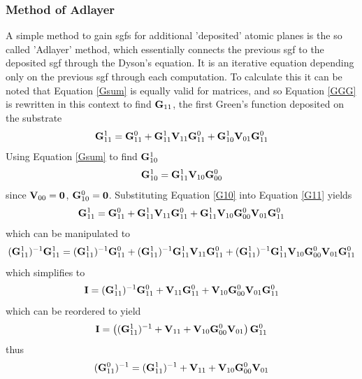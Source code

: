 \documentclass[a4paper, 12pt]{article}
\begin{document}
	\subsubsection{Method of Adlayer}
	A simple method to gain \gls{sgf}s for additional 'deposited' atomic planes is the so called 'Adlayer' method, which essentially connects the previous \gls{sgf} to the deposited \gls{sgf} through the Dyson's equation. It is an iterative equation depending only on the previous \gls{sgf} through each computation. To calculate this it can be noted that Equation \eqref{Gsum} is equally valid for matrices, and so Equation \eqref{GGG} is rewritten in this context to find ${\bf G}_{11}$, the first Green's function deposited on the substrate
	\begin{equation}\label{G11}
	{\bf G}_{11}^1={\bf G}_{11}^0+{\bf G}_{11}^1{\bf V}_{11}{\bf G}_{11}^0 +{\bf G}_{10}^1{\bf V}_{01}{\bf G}_{11}^0
\end{equation}
Using Equation \eqref{Gsum} to find ${\bf G}_{10}^1$
\begin{equation}\label{G10}
	{\bf G}_{10}^1={\bf G}_{11}^1{\bf V}_{10}{\bf G}_{00}^0
\end{equation}
since ${\bf V}_{00} = \bf 0$, ${\bf G}_{10}^0 = \bf 0$. Substituting Equation \eqref{G10} into Equation \eqref{G11} yields
	\begin{equation}
	{\bf G}_{11}^1={\bf G}_{11}^0+{\bf G}_{11}^1{\bf V}_{11}{\bf G}_{11}^0 +{\bf G}_{11}^1{\bf V}_{10}{\bf G}_{00}^0{\bf V}_{01}{\bf G}_{11}^0
\end{equation}
which can be manipulated to
	\begin{equation}
		({\bf G}_{11}^1)^{-1}{\bf G}_{11}^1=({\bf G}_{11}^1)^{-1}{\bf G}_{11}^0+({\bf G}_{11}^1)^{-1}{\bf G}_{11}^1{\bf V}_{11}{\bf G}_{11}^0 +({\bf G}_{11}^1)^{-1}{\bf G}_{11}^1{\bf V}_{10}{\bf G}_{00}^0{\bf V}_{01}{\bf G}_{11}^0
\end{equation}
which simplifies to 
	\begin{equation}
		{\bf I}=({\bf G}_{11}^1)^{-1}{\bf G}_{11}^0+{\bf V}_{11}{\bf G}_{11}^0 +{\bf V}_{10}{\bf G}_{00}^0{\bf V}_{01}{\bf G}_{11}^0
\end{equation}
which can be reordered to yield
	\begin{equation}
		{\bf I}=\left(({\bf G}_{11}^1)^{-1}+{\bf V}_{11} +{\bf V}_{10}{\bf G}_{00}^0{\bf V}_{01}\right){\bf G}_{11}^0
\end{equation}
thus
	\begin{equation}
		({\bf G}_{11}^0)^{-1}=({\bf G}_{11}^1)^{-1}+{\bf V}_{11} +{\bf V}_{10}{\bf G}_{00}^0{\bf V}_{01}
	\end{equation}
\end{document}
